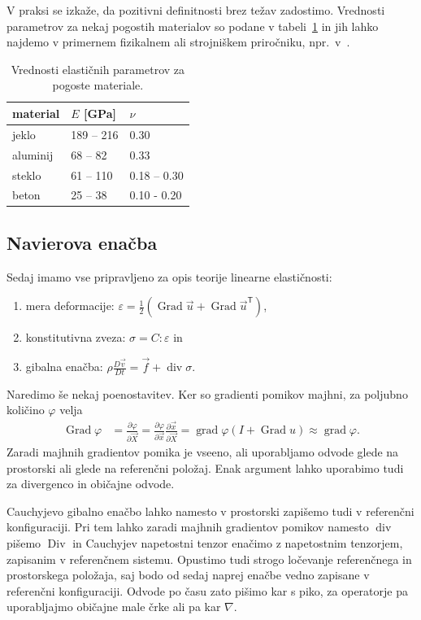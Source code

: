 \documentclass[12pt,a4paper,twoside]{article}
\theoremstyle{definition} %
\theoremstyle{plain} %
\numberwithin{equation}{section}
\newcommand{\T}{\mathsf{T}}
\renewcommand{\div}{\operatorname{div}}
\newcommand{\grad}{\operatorname{grad}}
\newcommand{\Div}{\operatorname{Div}}
\newcommand{\Grad}{\operatorname{Grad}}
\renewcommand{\phi}{\varphi}
\newcommand{\eps}{\varepsilon}
\newcommand{\dpar}[2]{\ensuremath{\frac{\partial #1}{\partial #2}}}
\newcommand{\DD}[2]{\ensuremath{\frac{D #1}{D #2}}}
\newcommand{\DDt}[1]{\DD{#1}{t}}
\newcommand{\vv}{\vec{v}}
\newcommand{\vu}{\vec{u}}
\newcommand{\vf}{\vec{f}}
\newcommand{\vX}{\vec{X}}
\newcommand{\vx}{\vec{x}}
\newcommand{\ts}{\sigma}
\begin{document}
V praksi se izkaže, da pozitivni definitnosti brez težav zadostimo. Vrednosti parametrov za nekaj
pogostih materialov so podane v tabeli~\ref{tab:Enu} in jih lahko najdemo v primernem fizikalnem ali
strojniškem priročniku, npr.~v~\cite[str.\ 11]{cambridge2003materials}.
\begin{table}[h]
  \centering
  \begin{tabular}{|l|l|l|} \hline
    material & $E$ [\unit{GPa}] & $\nu$ \\ \hline
    jeklo    & 189 -- 216 & 0.30 \\
    aluminij & 68 -- 82   & 0.33 \\
    steklo   & 61 -- 110  & 0.18 -- 0.30 \\
    beton    & 25 -- 38   & 0.10 - 0.20 \\ \hline
  \end{tabular}
  \caption{Vrednosti elastičnih parametrov za pogoste materiale.}
  \label{tab:Enu}
\end{table}

\subsection{Navierova enačba}
Sedaj imamo vse pripravljeno za opis teorije linearne elastičnosti:
\begin{enumerate}[\indent (1)]
  \item mera deformacije: $\eps = \frac12(\Grad \vu + \Grad \vu^\T)$,
  \item konstitutivna zveza: $\ts = C : \eps$ in
  \item gibalna enačba: $\rho \DDt{\vv} = \vf + \div \ts$.
\end{enumerate}

Naredimo še nekaj poenostavitev. Ker so gradienti pomikov majhni,
za poljubno količino $\phi$ velja
\begin{align}
  \Grad\phi &= \dpar{\phi}{\vX} = \dpar{\phi}{\vx} \dpar{\vx}{\vX} = \grad\phi
  (I + \Grad u) \approx \grad \phi.
\end{align}
Zaradi majhnih gradientov pomika je vseeno, ali uporabljamo odvode glede na
prostorski ali glede na referenčni položaj. Enak argument lahko uporabimo
tudi za divergenco in običajne odvode.

Cauchyjevo gibalno enačbo lahko namesto v prostorski zapišemo tudi v referenčni
konfiguraciji. Pri tem lahko zaradi majhnih gradientov pomikov namesto $\div$
pišemo $\Div$ in Cauchyjev napetostni tenzor enačimo z napetostnim tenzorjem,
zapisanim v referenčnem sistemu. Opustimo tudi strogo ločevanje referenčnega in
prostorskega položaja, saj bodo od sedaj naprej enačbe vedno zapisane v
referenčni konfiguraciji. Odvode po času zato pišimo kar s piko, za operatorje pa
uporabljajmo običajne male črke ali pa kar $\nabla$.
\end{document}
